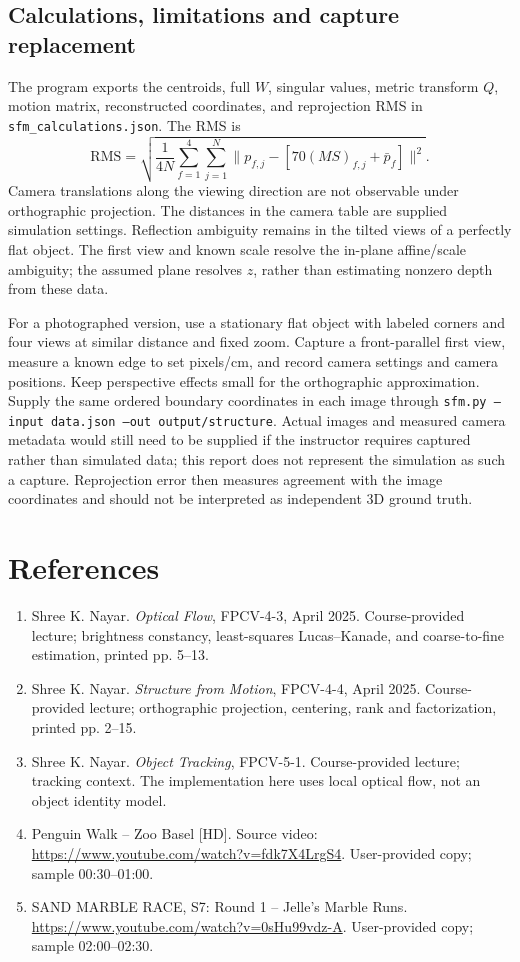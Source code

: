 \documentclass[10pt,letterpaper]{article}
\begin{document}
\newpage
\subsection*{Calculations, limitations and capture replacement}
The program exports the centroids, full $W$, singular values, metric transform $Q$,
motion matrix, reconstructed coordinates, and reprojection RMS in
\texttt{sfm\_calculations.json}. The RMS is
\[
\mathrm{RMS}=\sqrt{\frac{1}{4N}\sum_{f=1}^{4}\sum_{j=1}^{N}
\|p_{f,j}-[70(MS)_{f,j}+\bar p_f]\|^2}.
\]
Camera translations along the viewing direction are not observable under orthographic
projection. The distances in the camera table are supplied simulation settings.
Reflection ambiguity remains in the tilted views of a perfectly flat object.
The first view and known scale resolve the in-plane affine/scale ambiguity; the
assumed plane resolves $z$, rather than estimating nonzero depth from these data.

For a photographed version, use a stationary flat object with labeled corners and
four views at similar distance and fixed zoom. Capture a front-parallel first view,
measure a known edge to set pixels/cm, and record camera settings and camera
positions. Keep perspective effects small for the orthographic approximation.
Supply the same ordered boundary coordinates in each image through
\texttt{sfm.py --input data.json --out output/structure}. Actual images and measured
camera metadata would still need to be supplied if the instructor requires captured
rather than simulated data; this report does not represent the simulation as such a
capture. Reprojection error then measures agreement with the image coordinates and
should not be interpreted as independent 3D ground truth.

\section*{References}
\begin{enumerate}
\item Shree K. Nayar. \emph{Optical Flow}, FPCV-4-3, April 2025.
Course-provided lecture; brightness constancy, least-squares Lucas--Kanade, and
coarse-to-fine estimation, printed pp. 5--13.
\item Shree K. Nayar. \emph{Structure from Motion}, FPCV-4-4, April 2025.
Course-provided lecture; orthographic projection, centering, rank and factorization,
printed pp. 2--15.
\item Shree K. Nayar. \emph{Object Tracking}, FPCV-5-1.
Course-provided lecture; tracking context. The implementation here uses local
optical flow, not an object identity model.
\item Penguin Walk -- Zoo Basel [HD]. Source video:
\url{https://www.youtube.com/watch?v=fdk7X4LrgS4}.
User-provided copy; sample 00:30--01:00.
\item SAND MARBLE RACE, S7: Round 1 -- Jelle's Marble Runs.
\url{https://www.youtube.com/watch?v=0sHu99vdz-A}.
User-provided copy; sample 02:00--02:30.
\end{enumerate}
\end{document}
